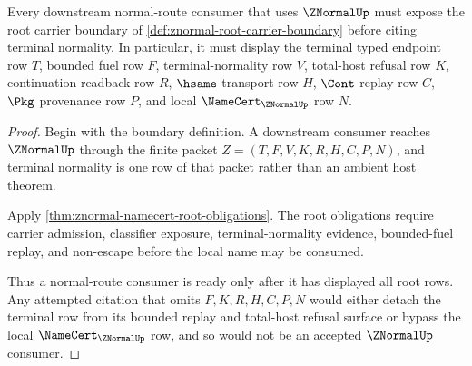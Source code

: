 \begin{theorem}
\label{thm:znormal-root-consumer-readiness}
Every downstream normal-route consumer that uses $\ZNormalUp$ must expose the root carrier boundary of \autoref{def:znormal-root-carrier-boundary} before citing terminal normality. In particular, it must display the terminal typed endpoint row $T$, bounded fuel row $F$, terminal-normality row $V$, total-host refusal row $K$, continuation readback row $R$, $\hsame$ transport row $H$, $\Cont$ replay row $C$, $\Pkg$ provenance row $P$, and local $\NameCert_{\ZNormalUp}$ row $N$.
\end{theorem}
\begin{proof}
Begin with the boundary definition. A downstream consumer reaches $\ZNormalUp$ through the finite packet $Z=(T,F,V,K,R,H,C,P,N)$, and terminal normality is one row of that packet rather than an ambient host theorem.

Apply \autoref{thm:znormal-namecert-root-obligations}. The root obligations require carrier admission, classifier exposure, terminal-normality evidence, bounded-fuel replay, and non-escape before the local name may be consumed.

Thus a normal-route consumer is ready only after it has displayed all root rows. Any attempted citation that omits $F,K,R,H,C,P,N$ would either detach the terminal row from its bounded replay and total-host refusal surface or bypass the local $\NameCert_{\ZNormalUp}$ row, and so would not be an accepted $\ZNormalUp$ consumer.
\end{proof}

